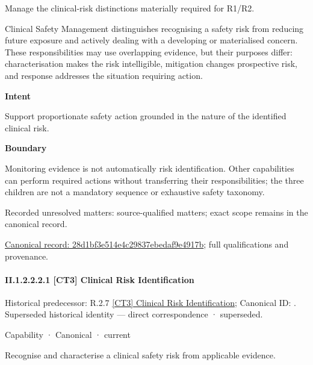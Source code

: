 Manage the clinical-risk distinctions materially required for R1/R2.



Clinical Safety Management distinguishes recognising a safety risk from reducing future exposure and actively dealing with a developing or materialised concern. These responsibilities may use overlapping evidence, but their purposes differ: characterisation makes the risk intelligible, mitigation changes prospective risk, and response addresses the situation requiring action.



\textbf{Intent}



Support proportionate safety action grounded in the nature of the identified clinical risk.



\textbf{Boundary}



Monitoring evidence is not automatically risk identification. Other capabilities can perform required actions without transferring their responsibilities; the three children are not a mandatory sequence or exhaustive safety taxonomy.


{\small Recorded unresolved matters: source-qualified matters; exact scope remains in the canonical record.}\par
{\footnotesize \href{../../../../../../../continuum/strategy/capability/28d1bf3e514e4c29837ebedaf9e4917b.md}{Canonical record: 28d1bf3e514e4c29837ebedaf9e4917b}; full qualifications and provenance.}\par
\paragraph*{II.1.2.2.2.1 [CT3] Clinical Risk Identification}
\label{navigation:II.1.2.2.2.1}

{\small Historical predecessor: R.2.7 \hyperref[element:690da55f1f5b4c44ba58cf67a717a564]{[CT3] Clinical Risk Identification}; Canonical ID: \texttt{}. Superseded historical identity — direct correspondence · superseded.}\par
\label{element:d54c19c6efaf42af82ad71a4142149d4}
{\small Capability · Canonical · current}\par

Recognise and characterise a clinical safety risk from applicable evidence.



